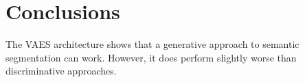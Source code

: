 \chapter{Conclusions}\label{chapter:conclusions}

The VAES architecture shows that a generative approach to semantic segmentation can work. However, it does perform slightly worse than discriminative approaches.